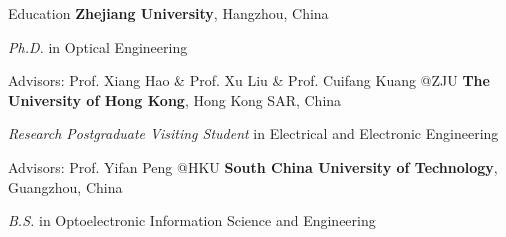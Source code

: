 \begin{rubric}{Education}
	\entry*[2018/09 -- 2023/12]%
	\textbf{Zhejiang University}, Hangzhou, China
	\par \textit{Ph.D.} in Optical Engineering
	\par Advisors: Prof. Xiang Hao \& Prof. Xu Liu \& Prof. Cuifang Kuang @ZJU
	\entry*[2022/12 -- 2023/04]%
	\textbf{The University of Hong Kong}, Hong Kong SAR, China
	\par \textit{Research Postgraduate Visiting Student} in Electrical and Electronic Engineering
	\par Advisors: Prof. Yifan Peng @HKU
	\entry*[2014/09 -- 2018/06]%
	\textbf{South China University of Technology}, Guangzhou, China
	\par \textit{B.S.} in Optoelectronic Information Science and Engineering
\end{rubric}
